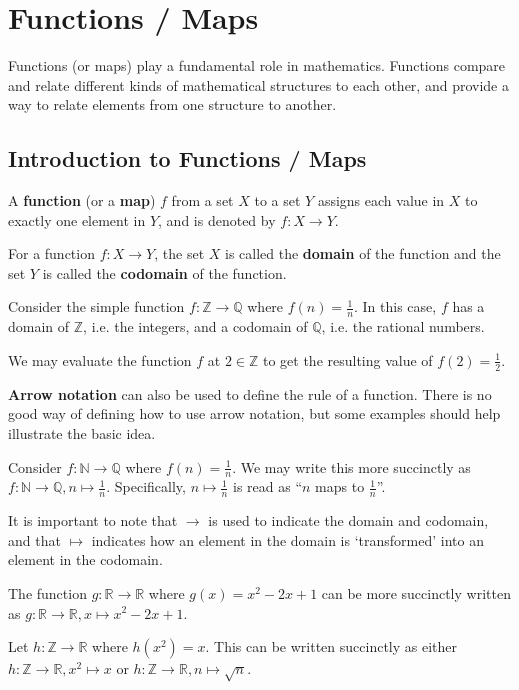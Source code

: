 \chapter{Functions / Maps}
Functions (or maps) play a fundamental role in mathematics. Functions compare and relate different kinds of mathematical structures to each other, and provide a way to relate elements from one structure to another.

\section{Introduction to Functions / Maps}
\begin{definition}
    A \textbf{function} (or a \textbf{map}) $f$ from a set $X$ to a set $Y$ assigns each value in $X$ to exactly one element in $Y$, and is denoted by $f: X \to Y$.
\end{definition}
\begin{definition}
    For a function $f: X \to Y$, the set $X$ is called the \textbf{domain} of the function and the set $Y$ is called the \textbf{codomain} of the function.
\end{definition}
\begin{example}
    Consider the simple function $f: \mathbb{Z} \to \mathbb{Q}$ where $f(n) = \frac1n$. In this case, $f$ has a domain of $\mathbb{Z}$, i.e. the integers, and a codomain of $\mathbb{Q}$, i.e. the rational numbers.

    We may evaluate the function $f$ at $2 \in \mathbb{Z}$ to get the resulting value of $f(2) = \frac12$.
\end{example}

\textbf{Arrow notation} can also be used to define the rule of a function. There is no good way of defining how to use arrow notation, but some examples should help illustrate the basic idea.
\begin{example}
    Consider $f: \mathbb{N} \to \mathbb{Q}$ where $f(n) = \frac1n$. We may write this more succinctly as $f: \mathbb{N} \to \mathbb{Q}, n \mapsto \frac1n$. Specifically, $n \mapsto \frac1n$ is read as ``$n$ maps to $\frac1n$''.
    
    It is important to note that $\to$ is used to indicate the domain and codomain, and that $\mapsto$ indicates how an element in the domain is `transformed' into an element in the codomain.
\end{example}
\begin{example}
    The function $g: \mathbb{R} \to \mathbb{R}$ where $g(x) = x^2 - 2x + 1$ can be more succinctly written as $g: \mathbb{R} \to \mathbb{R}, x \mapsto x^2 - 2x + 1$.
\end{example}
\begin{example}
    Let $h: \mathbb{Z} \to \mathbb{R}$ where $h(x^2) = x$. This can be written succinctly as either $h: \mathbb{Z} \to \mathbb{R}, x^2 \mapsto x$ or $h: \mathbb{Z} \to \mathbb{R}, n \mapsto \sqrt n$.
\end{example}

